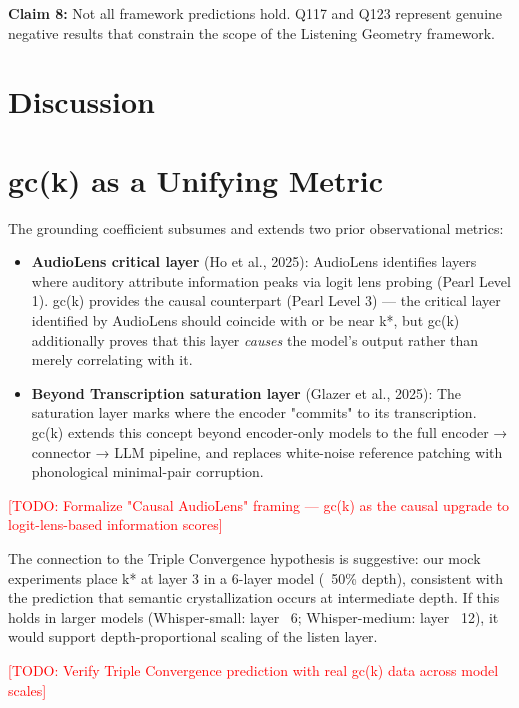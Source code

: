 \documentclass[a4paper]{article}
\begin{document}
{{\textbf{Claim 8:} Not all framework predictions hold. Q117 and Q123 represent genuine negative results that constrain the scope of the Listening Geometry framework.


\section{Discussion}

\section{gc(k) as a Unifying Metric}

The grounding coefficient subsumes and extends two prior observational metrics:

\begin{itemize}
\item \textbf{AudioLens critical layer} (Ho et al., 2025): AudioLens identifies layers where auditory attribute information peaks via logit lens probing (Pearl Level 1). gc(k) provides the causal counterpart (Pearl Level 3) — the critical layer identified by AudioLens should coincide with or be near k*, but gc(k) additionally proves that this layer \textit{causes} the model's output rather than merely correlating with it.
\end{itemize}

\begin{itemize}
\item \textbf{Beyond Transcription saturation layer} (Glazer et al., 2025): The saturation layer marks where the encoder "commits" to its transcription. gc(k) extends this concept beyond encoder-only models to the full encoder → connector → LLM pipeline, and replaces white-noise reference patching with phonological minimal-pair corruption.
\end{itemize}

\textcolor{red}{[TODO: Formalize "Causal AudioLens" framing — gc(k) as the causal upgrade to logit-lens-based information scores]}

The connection to the Triple Convergence hypothesis is suggestive: our mock experiments place k* at layer 3 in a 6-layer model (~50\% depth), consistent with the prediction that semantic crystallization occurs at intermediate depth. If this holds in larger models (Whisper-small: layer ~6; Whisper-medium: layer ~12), it would support depth-proportional scaling of the listen layer.

\textcolor{red}{[TODO: Verify Triple Convergence prediction with real gc(k) data across model scales]}


}}
\end{document}
